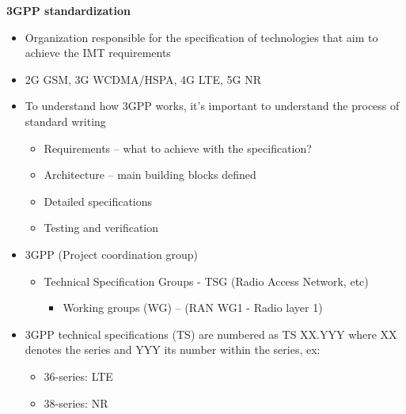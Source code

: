 \documentclass{beamer}
\begin{document}
\begin{frame}[allowframebreaks]
		\textbf{3GPP standardization}
		\begin{itemize}
			\item Organization responsible for the specification of technologies that aim to achieve the IMT requirements
			\item 2G GSM, 3G WCDMA/HSPA, 4G LTE, 5G NR
			\item To understand how 3GPP works, it's important to understand the process of standard writing
			\begin{itemize}
				\item Requirements -- what to achieve with the specification?
				\item Architecture -- main building blocks defined
				\item Detailed specifications
				\item Testing and verification
			\end{itemize}
			\item 3GPP (Project coordination group)
			\begin{itemize}
				\item Technical Specification Groups - TSG (Radio Access Network, etc)
				\begin{itemize}
					\item Working groups (WG) -- (RAN WG1 - Radio layer 1)
				\end{itemize}
			\end{itemize}
			\item 3GPP technical specifications (TS) are numbered as TS XX.YYY where XX denotes the series and YYY its number within the series, ex:
			\begin{itemize}
				\item 36-series: LTE
				\item 38-series: NR
			\end{itemize}
		\end{itemize}
	\end{frame}
\end{document}
